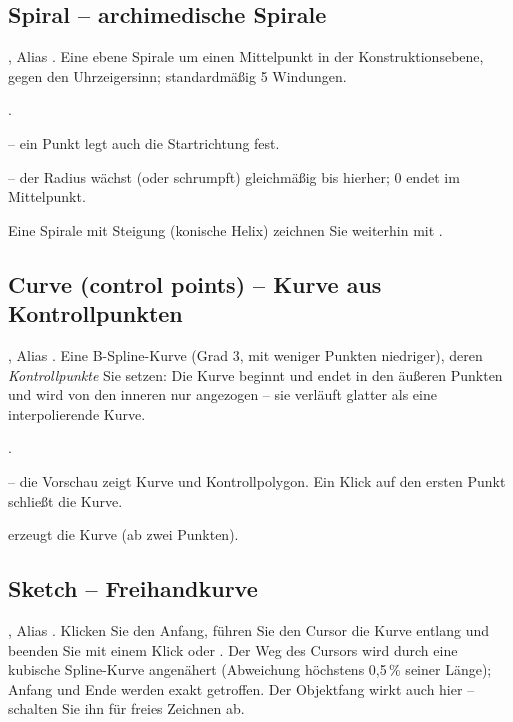 \subsection{Spiral -- archimedische Spirale}\label{sec:cmd-spiral}
, Alias . Eine ebene Spirale um einen Mittelpunkt in der
Konstruktionsebene, gegen den Uhrzeigersinn; standardmäßig 5 Windungen.
\begin{schritte}
\item {}.
\item {} -- ein Punkt legt auch die
  Startrichtung fest.
\item {} -- der Radius wächst (oder
  schrumpft) gleichmäßig bis hierher; 0 endet im Mittelpunkt.
\end{schritte}
Eine Spirale mit Steigung (konische Helix) zeichnen Sie weiterhin mit .

\subsection{Curve (control points) -- Kurve aus Kontrollpunkten}\label{sec:cmd-curve}
, Alias . Eine B-Spline-Kurve (Grad 3, mit weniger Punkten niedriger),
deren \emph{Kontrollpunkte} Sie setzen: Die Kurve beginnt und endet in den äußeren Punkten und
wird von den inneren nur angezogen -- sie verläuft glatter als eine interpolierende Kurve.
\begin{schritte}
\item {}.
\item {} -- die
  Vorschau zeigt Kurve und Kontrollpolygon. Ein Klick auf den ersten Punkt schließt die Kurve.
\item {} erzeugt die Kurve (ab zwei Punkten).
\end{schritte}

\subsection{Sketch -- Freihandkurve}\label{sec:cmd-sketch}
, Alias . Klicken Sie den Anfang, führen Sie den Cursor die Kurve entlang
und beenden Sie mit einem Klick oder . Der Weg des Cursors wird durch eine kubische
Spline-Kurve angenähert (Abweichung höchstens 0,5\,\% seiner Länge); Anfang und Ende werden
exakt getroffen. Der Objektfang wirkt auch hier -- schalten Sie ihn für freies Zeichnen ab.

